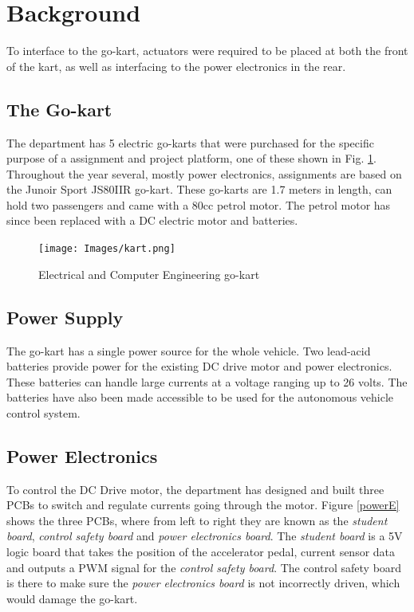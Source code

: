 \section{Background}
  To interface to the go-kart, actuators were required to be placed at both the
  front of the kart, as well as interfacing to the power electronics in the
  rear.

\subsection{The Go-kart}
  The department has 5 electric go-karts that were purchased for the specific
  purpose of a assignment and project platform, one of these shown in Fig.
  \ref{go-kart}. Throughout the year several, mostly power electronics,
  assignments are based on the Junoir Sport JS80IIR go-kart\cite{go-kart}. These
  go-karts are 1.7 meters in length, can hold two passengers and came with a
  80cc petrol motor. The petrol motor has since been replaced with a DC electric
  motor and batteries.

  \begin{figure}[h]
      \centering
      \texttt{[image: Images/kart.png]}
      \caption[Junoir Sport - JS80IIR go-kart]{Electrical and Computer
      Engineering go-kart}
      \label{go-kart}
  \end{figure}


\subsection{Power Supply}
  The go-kart has a single power source for the whole vehicle. Two lead-acid
  batteries provide power for the existing DC drive motor and power electronics.
  These batteries can handle large currents at a voltage ranging up to 26 volts.
  The batteries have also been made accessible to be used for the autonomous
  vehicle control system.

\subsection{Power Electronics}
  To control the DC Drive motor, the department has designed and built three
  PCBs to switch and regulate currents going through the motor. Figure
  \ref{powerE} shows the three PCBs, where from left to right they are known as
  the \emph{student board}, \emph{control safety board} and \emph{power
  electronics board}. The \emph{student board} is a 5V logic board that takes
  the position of the accelerator pedal, current sensor data and outputs a PWM
  signal for the \emph{control safety board}. The control safety board is there
  to make sure the \emph{power electronics board} is not incorrectly driven,
  which would damage the go-kart.

